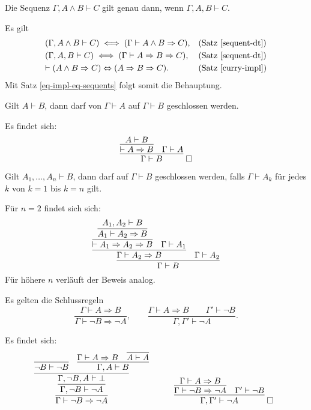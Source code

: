 \begin{Satz}
Die Sequenz $\Gamma, A\land B\vdash C$ gilt genau dann, wenn $\Gamma,A,B\vdash C$.
\end{Satz}
\begin{Beweis}
Es gilt
\begin{align*}
& (\Gamma, A\land B\vdash C)\iff (\Gamma\vdash A\land B\Rightarrow C),
  &&\text{(Satz \ref{sequent-dt})}\\
& (\Gamma,A,B\vdash C)\iff (\Gamma\vdash A\Rightarrow B\Rightarrow C),
  &&\text{(Satz \ref{sequent-dt})}\\
& {\vdash (A\land B\Rightarrow C)\Leftrightarrow (A\Rightarrow B\Rightarrow C)}.
  &&\text{(Satz \ref{curry-impl})}
\end{align*}
Mit Satz \ref{eq-impl-eq-sequents} folgt somit die Behauptung.\,\qedsymbol
\end{Beweis}

\begin{Satz}\newlinefirst
Gilt $A\vdash B$, dann darf von $\Gamma\vdash A$ auf $\Gamma\vdash B$
geschlossen werden.
\end{Satz}
\begin{Beweis} Es findet sich:
\[\infer{\Gamma\vdash B}{
  \infer{\vdash A\Rightarrow B}{A\vdash B}
  & \Gamma\vdash A}\;\qedsymbol\]
\end{Beweis}

\begin{Satz}\newlinefirst
Gilt $A_1,\ldots,A_n\vdash B$, dann darf auf $\Gamma\vdash B$
geschlossen werden, falls $\Gamma\vdash A_k$ für jedes $k$
von $k=1$ bis $k=n$ gilt.
\end{Satz}
\begin{Beweis} Für $n=2$ findet sich sich:
\[\infer{\Gamma\vdash B}{
  \infer{\Gamma\vdash A_2\Rightarrow B}{
    \infer{\vdash A_1\Rightarrow A_2\Rightarrow B}{
      \infer{A_1\vdash A_2\Rightarrow B}{A_1,A_2\vdash B}}
    & \Gamma\vdash A_1}
  & \Gamma\vdash A_2}\]
Für höhere $n$ verläuft der Beweis analog.\,\qedsymbol
\end{Beweis}

\newpage
\begin{Satz}\label{modus-tollens}
Es gelten die Schlussregeln
\[\dfrac{\Gamma\vdash A\Rightarrow B}{\Gamma\vdash\neg B\Rightarrow\neg A},\qquad
\dfrac{\Gamma\vdash A\Rightarrow B\qquad\Gamma'\vdash\neg B}{\Gamma,\Gamma'\vdash\neg A}.\]
\end{Satz}
\begin{Beweis} Es findet sich:
\[\begin{array}{@{}l@{\qquad\quad}l}
\infer{\Gamma\vdash\neg B\Rightarrow\neg A}{
  \infer{\Gamma,\neg B\vdash\neg A}{
    \infer{\Gamma,\neg B, A\vdash\bot}{
      \infer{\neg B\vdash\neg B}{}
      & \infer{\Gamma,A\vdash B}{
          \Gamma\vdash A\Rightarrow B
          & \infer{A\vdash A}{}}}}}
&
\infer{\Gamma,\Gamma'\vdash\neg A}{
  \infer{\Gamma\vdash\neg B\Rightarrow\neg A}{\Gamma\vdash A\Rightarrow B}
  & \Gamma'\vdash\neg B}\;\qedsymbol
\end{array}
\]
\end{Beweis}

